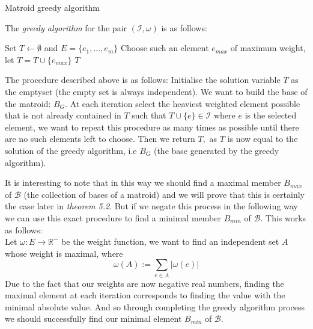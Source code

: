 \documentclass[../main.tex]{subfiles}
\begin{document}
\begin{algorithm}[H]
\caption{Matroid greedy algorithm}\label{matroid_ver}
The \textit{greedy algorithm} for the pair $(\mathcal{I}, \omega)$ is as follows:
\begin{algorithmic}[1]
\State Set $T \gets \emptyset$ and $E = \{e_1,...,e_m\}$
\State Choose such an element $e_{max}$ of maximum weight,
\State let $T = T \cup \{e_{max}\}$
\EndWhile
\State\Return $T$
\EndProcedure
\end{algorithmic}
\end{algorithm}

The procedure described above is as follows: Initialise the solution variable $T$ as the emptyset (the empty set is always independent). We want to build the base of the matroid: $B_G.$ At each iteration select the heaviest weighted element possible that is not already contained in $T$ such that $T \cup \{e\} \in \mathcal{I}$ where $e$ is the selected element, we want to repeat this procedure as many times as possible until there are no such elements left to choose. Then we return $T,$ as $T$ is now equal to the solution of the greedy algorithm, i.e $B_G$ (the base generated by the greedy algorithm). 

\begin{rem}
It is interesting to note that in this way we should find a maximal member $B_{max}$ of $\mathcal{B}$ (the collection of bases of a matroid) and we will prove that this is certainly the case later in \textit{theorem 5.2}. But if we negate this process in the following way we can use this exact procedure to find a minimal member $B_{min}$ of $\mathcal{B}.$ This works as follows:\\
Let $\omega : E \longrightarrow \mathbb{R^{-}}$ be the weight function, we want to find an independent set $A$ whose weight is maximal, where
\begin{equation}
\omega(A) := \sum_{e \in A} |\omega (e)|
\end{equation}
Due to the fact that our weights are now negative real numbers, finding the maximal element at each iteration corresponds to finding the value with the minimal absolute value. And so through completing the greedy algorithm process we should successfully find our minimal element $B_{min}$ of $\mathcal{B}.$
\end{rem}
\end{document}
